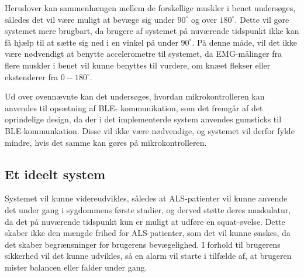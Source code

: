 \noindent
Herudover kan sammenhængen mellem de forskellige muskler i benet undersøges, således det vil være muligt at bevæge sig under $90^{\circ}$ og over $180^{\circ}$. Dette vil gøre systemet mere brugbart, da brugere af systemet på nuværende tidspunkt ikke kan få hjælp til at sætte sig ned i en vinkel på under $90^{\circ}$. På denne måde, vil det ikke være nødvendigt at benytte accelerometre til systemet, da EMG-målinger fra flere muskler i benet vil kunne benyttes til vurdere, om knæet flekser eller ekstenderer fra $0-180^{\circ}$.

Ud over ovennævnte kan det undersøges, hvordan mikrokontrolleren kan anvendes til opsætning af BLE- kommunikation, som det fremgår af det oprindelige design, da der i det implementerde system anvendes gumsticks til BLE-kommunkation. Disse vil ikke være nødvendige, og systemet vil derfor fylde mindre, hvis det samme kan gøres på mikrokontrolleren. 

\subsection{Et ideelt system}
Systemet vil kunne videreudvikles, således at ALS-patienter vil kunne anvende det under gang i sygdommens første stadier, og derved støtte deres muskulatur, da det på nuværende tidspunkt kun er muligt at udføre en squat-øvelse. Dette skaber ikke den mængde frihed for ALS-patienter, som det vil kunne ønskes, da det skaber begrænsninger for brugerens bevægelighed. I forhold til brugerens sikkerhed vil det kunne udvikles, så en alarm vil starte i tilfælde af, at brugeren mister balancen eller falder under gang. 




